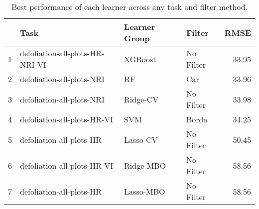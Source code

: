 \begin{table}[h!]
\centering
\caption{Best performance of each learner across any task and filter method.} 
\label{tab:best-learner-perf}
\begin{tabular}{rlllr}
  \hline
 & Task & Learner Group & Filter & RMSE \\ 
  \hline
1 & defoliation-all-plots-HR-NRI-VI & XGBoost & No Filter & 33.95 \\ 
  2 & defoliation-all-plots-NRI & RF & Car & 33.96 \\ 
  3 & defoliation-all-plots-NRI & Ridge-CV & No Filter & 33.98 \\ 
  4 & defoliation-all-plots-HR-VI & SVM & Borda & 34.25 \\ 
  5 & defoliation-all-plots-HR & Lasso-CV & No Filter & 50.45 \\ 
  6 & defoliation-all-plots-HR-VI & Ridge-MBO & No Filter & 58.56 \\ 
  7 & defoliation-all-plots-HR & Lasso-MBO & No Filter & 58.56 \\ 
   \hline
\end{tabular}
\end{table}
